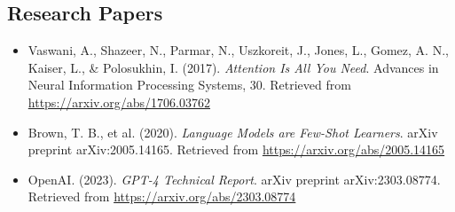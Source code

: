 \documentclass[12pt,a4paper]{article}
\begin{document}
\subsection{Research Papers}
\begin{itemize}
    \item[{[14]}] Vaswani, A., Shazeer, N., Parmar, N., Uszkoreit, J., Jones, L., Gomez, A. N., Kaiser, L., & Polosukhin, I. (2017). \textit{Attention Is All You Need}. Advances in Neural Information Processing Systems, 30. Retrieved from \url{https://arxiv.org/abs/1706.03762}
    \item[{[15]}] Brown, T. B., et al. (2020). \textit{Language Models are Few-Shot Learners}. arXiv preprint arXiv:2005.14165. Retrieved from \url{https://arxiv.org/abs/2005.14165}
    \item[{[16]}] OpenAI. (2023). \textit{GPT-4 Technical Report}. arXiv preprint arXiv:2303.08774. Retrieved from \url{https://arxiv.org/abs/2303.08774}
\end{itemize}
\end{document}
